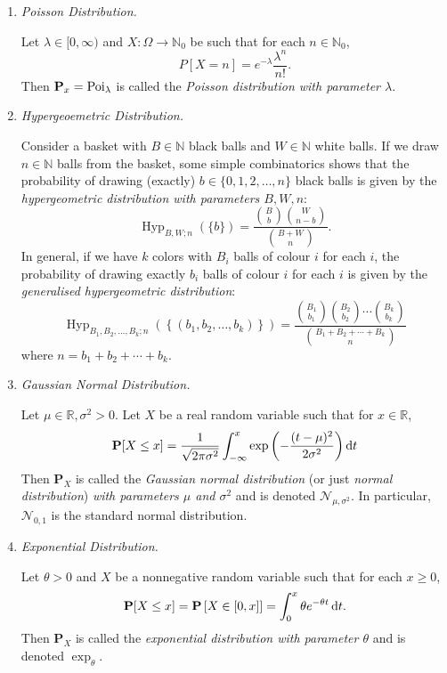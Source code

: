 \begin{enumerate}
    \item \textit{Poisson Distribution.}
    
    Let $\lambda\in[0,\infty)$ and $X:\Omega\to\mathbb{N}_0$ be such that for each $n\in\mathbb{N}_0$,
    $$P[X=n]=e^{-\lambda}\frac{\lambda^n}{n!}.$$
    Then $\textbf{P}_x=\operatorname{Poi}_\lambda$ is called the \textit{Poisson distribution with parameter $\lambda$}.
    
    \item \textit{Hypergeoemetric Distribution.}
    
    Consider a basket with $B\in\mathbb{N}$ black balls and $W\in\mathbb{N}$ white balls. If we draw $n\in\mathbb{N}$ balls from the basket, some simple combinatorics shows that the probability of drawing (exactly) $b\in\{0,1,2,\ldots,n\}$ black balls is given by the \textit{hypergeometric distribution with parameters $B,W,n$}:
    $$\operatorname{Hyp}_{B,W;n}(\{b\})=\frac{\binom{B}{b}\binom{W}{n-b}}{\binom{B+W}{n}}.$$
    In general, if we have $k$ colors with $B_i$ balls of colour $i$ for each $i$, the probability of drawing exactly $b_i$ balls of colour $i$ for each $i$ is given by the \textit{generalised hypergeometric distribution}:
    $$\operatorname{Hyp}_{B_1,B_2,\ldots,B_k;n}(\left\{(b_1,b_2,\ldots,b_k)\right\}) = \frac{\binom{B_1}{b_1}\binom{B_2}{b_2}\cdots\binom{B_k}{b_k}}{\binom{B_1+B_2+\cdots+B_k}{n}}$$
    where $n=b_1+b_2+\cdots+b_k$.
    
    \item \textit{Gaussian Normal Distribution.}
    
    Let $\mu\in\mathbb{R}, \sigma^2>0$. Let $X$ be a real random variable such that for $x\in\mathbb{R}$,
    $$\textbf{P}[X\leq x]=\frac{1}{\sqrt{2\pi\sigma^2}}\int_{-\infty}^x \exp\left(-\frac{(t-\mu)^2}{2\sigma^2}\right)\operatorname{d}\!{t}$$
    Then $\textbf{P}_X$ is called the \textit{Gaussian normal distribution} (or just \textit{normal distribution}) \textit{with parameters $\mu$ and $\sigma^2$} and is denoted $\mathcal{N}_{\mu,\sigma^2}$. In particular, $\mathcal{N}_{0,1}$ is the standard normal distribution. 
    
    \item \textit{Exponential Distribution.}
    
    Let $\theta>0$ and $X$ be a nonnegative random variable such that for each $x\geq 0$,
    $$\textbf{P}[X\leq x]=\textbf{P}\left[X\in[0,x]\right]=\int_{0}^x\theta e^{-\theta t}\operatorname{d}\!{t}.$$
    Then $\textbf{P}_X$ is called the \textit{exponential distribution with parameter $\theta$} and is denoted $\exp_\theta$.
    

\end{enumerate}
